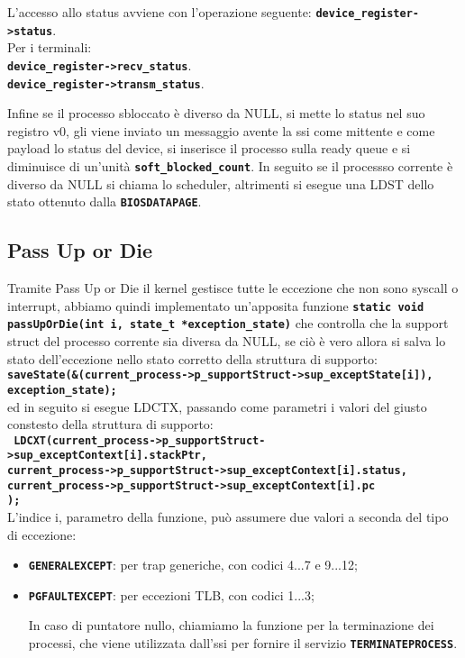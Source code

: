 \documentclass{article}
\begin{document}
L'accesso allo status avviene con l'operazione seguente: 
\texttt{\textbf{device\_register->status}}. \\
Per i terminali: \\
\texttt{\textbf{device\_register->recv\_status}}. \\
\texttt{\textbf{device\_register->transm\_status}}.

Infine se il processo sbloccato è diverso da NULL, si mette lo status nel suo registro v0, gli viene inviato un messaggio 
avente la ssi come mittente e come payload lo status del device, si inserisce il processo sulla ready queue e si diminuisce di un'unità \texttt{\textbf{soft\_blocked\_count}}.
In seguito se il processso corrente è diverso da NULL si chiama lo scheduler, altrimenti si esegue una LDST dello stato 
ottenuto dalla \texttt{\textbf{BIOSDATAPAGE}}. 
\subsection{Pass Up or Die}
Tramite Pass Up or Die il kernel gestisce tutte le eccezione che non sono syscall o interrupt, abbiamo quindi implementato 
un'apposita funzione \texttt{\textbf{static void passUpOrDie(int i, state\_t *exception\_state)}} che controlla che la 
support struct del processo corrente sia diversa da NULL, se ciò è vero allora si salva lo stato dell'eccezione nello stato 
corretto della struttura di supporto: \\ 
\texttt{\textbf{saveState(\&(current\_process->p\_supportStruct->sup\_exceptState[i]), exception\_state);}}
\\ ed in seguito si esegue LDCTX, passando come parametri i valori del giusto constesto 
della struttura di supporto: \\ 
\texttt{\textbf{
      LDCXT(current\_process->p\_supportStruct->sup\_exceptContext[i].stackPtr, \\
            current\_process->p\_supportStruct->sup\_exceptContext[i].status, \\
            current\_process->p\_supportStruct->sup\_exceptContext[i].pc \\
      );
 }} \\
 L'indice i, parametro della funzione, può assumere due valori a seconda del tipo di eccezione:
 \begin{itemize}
    \item \texttt{\textbf{GENERALEXCEPT}}: per trap generiche, con codici 4...7 e 9...12;
    \item \texttt{\textbf{PGFAULTEXCEPT}}: per eccezioni TLB, con codici 1...3;

In caso di puntatore nullo, chiamiamo la funzione per la terminazione dei processi, che viene utilizzata dall'ssi per 
     fornire il servizio \texttt{\textbf{TERMINATEPROCESS}}.
\end{itemize}
\newpage
\end{document}
